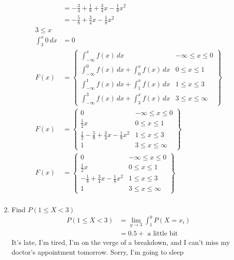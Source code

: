 \documentclass{article}
\begin{document}
\begin{enumerate}[\quad(a)]
\begin{align*}
		&= -\tfrac{3}{4} + \tfrac{1}{8} + \tfrac{3}{4}x - \tfrac{1}{8} x^2\\
		&= -\tfrac{5}{8} + \tfrac{3}{4} x - \tfrac{1}{8} x^2\\
		3 \le x\\
		\int_{3}^{x} 0\, dx &= 0\\
		F(x) &= \left\{
		\begin{array}{ll}
			\int_{-\infty}^{x} f(x) \, dx & -\infty \le x \leq 0 \\
			\int_{-\infty}^{0} f(x) \, dx + \int_{0}^{x} f(x) \, dx  & 0 \le x \le 1\\
			\int_{-\infty}^{1} f(x) \, dx + \int_{1}^{x} f(x) \, dx & 1\leq x \leq 3\\
			\int_{-\infty}^{3} f(x) \, dx + \int_{3}^{x} f(x) \, dx & 3 \le x \le \infty
		\end{array}
		\right\} \\
		F(x) &= \left\{
		\begin{array}{ll}
			0 & -\infty \le x \leq 0 \\
			\tfrac{1}{2}x& 0 \le x \le 1\\
			\tfrac{1}{2} -\tfrac{5}{8} + \tfrac{3}{4} x - \tfrac{1}{8} x^2 & 1\leq x \leq 3\\
			1 & 3 \le x \le \infty
			\end{array}
		\right\} \\
		F(x) &= \left\{
		\begin{array}{ll}
		0 & -\infty \le x \leq 0 \\
		\tfrac{1}{2}x& 0 \le x \le 1\\
		-\tfrac{1}{8} + \tfrac{3}{4} x - \tfrac{1}{8} x^2 & 1\leq x \leq 3\\
		1 & 3 \le x \le \infty
		\end{array}
		\right\} \\
	\end{align*}
	\item Find $P(1\leq X < 3)$
	\begin{align*}
		P(1\leq X < 3) &= \lim_{y\rightarrow 3} \int_{1}^{y} P(X=x_i)\\
		&= 0.5 + \text{ a little bit}
	\end{align*}
	It's late, I'm tired, I'm on the verge of a breakdown, and I can't miss my doctor's appointment tomorrow. Sorry, I'm going to sleep
\end{enumerate}
\end{document}
